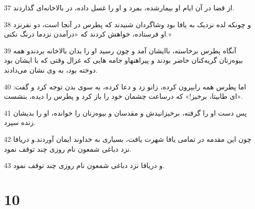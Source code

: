 \par 37 از قضا در آن ایام او بیمارشده، بمرد و او را غسل داده، در بالاخانه‌ای گذاردند.
\par 38 و چونکه لده نزدیک به یافا بود وشاگردان شنیدند که پطرس در آنجا است، دو نفرنزد او فرستاده، خواهش کردند که «در‌آمدن نزدما درنگ نکنی.»
\par 39 آنگاه پطرس برخاسته، باایشان آمد و چون رسید او را بدان بالاخانه بردندو همه بیوه‌زنان گریه‌کنان حاضر بودند و پیراهنهاو جامه هایی که غزال وقتی که با ایشان بود دوخته بود، به وی نشان می‌دادند.
\par 40 اما پطرس همه رابیرون کرده، زانو زد و دعا کرده، به سوی بدن توجه کرد و گفت: «ای طابیتا، برخیز!» که درساعت چشمان خود را باز کرد و پطرس را دیده، بنشست.
\par 41 پس دست او را گرفته، برخیزانیدش و مقدسان و بیوه‌زنان را خوانده، او را بدیشان زنده سپرد.
\par 42 چون این مقدمه در تمامی یافا شهرت یافت، بسیاری به خداوند ایمان آوردند.و دریافا نزد دباغی شمعون نام روزی چند توقف نمود.
\par 43 و دریافا نزد دباغی شمعون نام روزی چند توقف نمود.

\chapter{10}

